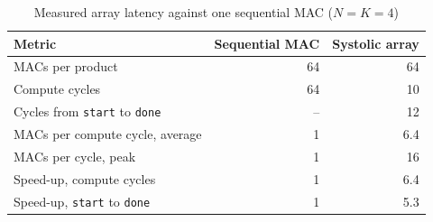 \begin{table}[t]
\centering
\caption{Measured array latency against one sequential MAC ($N = K = 4$)}
\label{tab:perf}
\footnotesize
\begin{tabular}{@{}lrr@{}}
\toprule
Metric & Sequential MAC & Systolic array \\
\midrule
MACs per product & 64 & 64 \\
Compute cycles & 64 & 10 \\
Cycles from \texttt{start} to \texttt{done} & -- & 12 \\
MACs per compute cycle, average & 1 & 6.4 \\
MACs per cycle, peak & 1 & 16 \\
Speed-up, compute cycles & 1 & 6.4 \\
Speed-up, \texttt{start} to \texttt{done} & 1 & 5.3 \\
\bottomrule
\end{tabular}
\end{table}
